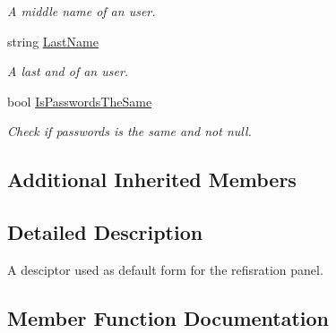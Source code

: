 \begin{DoxyCompactItemize}
\begin{DoxyCompactList}\small\item\em A middle name of an user. \end{DoxyCompactList}\item 
string \mbox{\hyperlink{class_wpf_handler_1_1_u_i_1_1_controls_1_1_logon_1_1_default_registration_panel_descriptor_a1cbf11f8c75a668f9a7398d3618857c9}{Last\+Name}}
\begin{DoxyCompactList}\small\item\em A last and of an user. \end{DoxyCompactList}\item 
bool \mbox{\hyperlink{class_wpf_handler_1_1_u_i_1_1_controls_1_1_logon_1_1_default_registration_panel_descriptor_aecc64f8b53d3fb5e69d55d691a320a4b}{Is\+Passwords\+The\+Same}}
\begin{DoxyCompactList}\small\item\em Check if passwords is the same and not null. \end{DoxyCompactList}\end{DoxyCompactItemize}
\subsection*{Additional Inherited Members}


\subsection{Detailed Description}
A desciptor used as default form for the refisration panel. 



\subsection{Member Function Documentation}
\mbox{\label{class_wpf_handler_1_1_u_i_1_1_controls_1_1_logon_1_1_default_registration_panel_descriptor_a9154a1e27afdf8d40da139042ee7e609}} 
